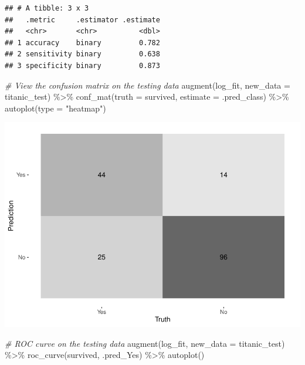 \documentclass[
]{article}
\newenvironment{Shaded}{\begin{snugshade}}{\end{snugshade}}
\newcommand{\AttributeTok}[1]{\textcolor[rgb]{0.77,0.63,0.00}{#1}}
\newcommand{\CommentTok}[1]{\textcolor[rgb]{0.56,0.35,0.01}{\textit{#1}}}
\newcommand{\FunctionTok}[1]{\textcolor[rgb]{0.00,0.00,0.00}{#1}}
\newcommand{\NormalTok}[1]{#1}
\newcommand{\SpecialCharTok}[1]{\textcolor[rgb]{0.00,0.00,0.00}{#1}}
\newcommand{\StringTok}[1]{\textcolor[rgb]{0.31,0.60,0.02}{#1}}
\begin{document}
\begin{verbatim}
## # A tibble: 3 x 3
##   .metric     .estimator .estimate
##   <chr>       <chr>          <dbl>
## 1 accuracy    binary         0.782
## 2 sensitivity binary         0.638
## 3 specificity binary         0.873
\end{verbatim}

\begin{Shaded}
\begin{Highlighting}[]
\CommentTok{\# View the confusion matrix on the testing data}
\FunctionTok{augment}\NormalTok{(log\_fit, }\AttributeTok{new\_data =}\NormalTok{ titanic\_test) }\SpecialCharTok{\%\textgreater{}\%}
  \FunctionTok{conf\_mat}\NormalTok{(}\AttributeTok{truth =}\NormalTok{ survived, }\AttributeTok{estimate =}\NormalTok{ .pred\_class) }\SpecialCharTok{\%\textgreater{}\%}
  \FunctionTok{autoplot}\NormalTok{(}\AttributeTok{type =} \StringTok{"heatmap"}\NormalTok{)}
\end{Highlighting}
\end{Shaded}

\includegraphics{hw3_files/figure-latex/unnamed-chunk-19-1.pdf}

\begin{Shaded}
\begin{Highlighting}[]
\CommentTok{\# ROC curve on the testing data}
\FunctionTok{augment}\NormalTok{(log\_fit, }\AttributeTok{new\_data =}\NormalTok{ titanic\_test) }\SpecialCharTok{\%\textgreater{}\%}
  \FunctionTok{roc\_curve}\NormalTok{(survived, .pred\_Yes) }\SpecialCharTok{\%\textgreater{}\%}
  \FunctionTok{autoplot}\NormalTok{()}
\end{Highlighting}
\end{Shaded}
\end{document}
